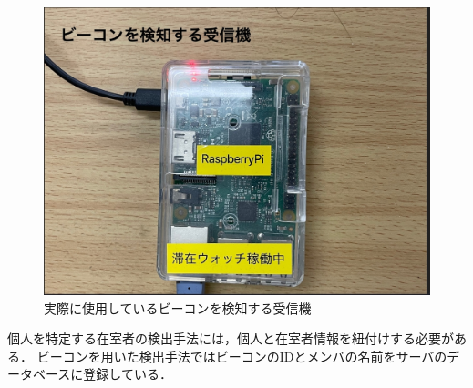 \begin{figure}[H]
  \begin{center}
    \includegraphics[width=150mm]{image/RasPi.jpg}
    \caption{実際に使用しているビーコンを検知する受信機}
    \label{fig:raspi}
  \end{center}
\end{figure}

個人を特定する在室者の検出手法には，個人と在室者情報を紐付けする必要がある．
ビーコンを用いた検出手法ではビーコンのIDとメンバの名前をサーバのデータベースに登録している．


